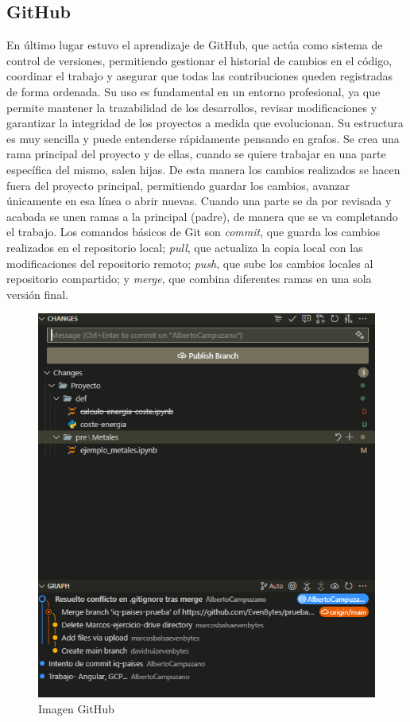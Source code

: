 \subsection{GitHub}
%
%
En último lugar estuvo el aprendizaje de GitHub, que actúa como sistema de control de versiones, permitiendo gestionar el historial de cambios en el código, coordinar el trabajo y asegurar que todas las contribuciones queden registradas de forma ordenada. Su uso es fundamental en un entorno profesional, ya que permite mantener la trazabilidad de los desarrollos, revisar modificaciones y garantizar la integridad de los proyectos a medida que evolucionan. Su estructura es muy sencilla y puede entenderse rápidamente pensando en grafos. Se crea una rama principal del proyecto y de ellas, cuando se quiere trabajar en una parte específica del mismo, salen hijas. De esta manera los cambios realizados se hacen fuera del proyecto principal, permitiendo guardar los cambios, avanzar únicamente en esa línea o abrir nuevas. Cuando una parte se da por revisada y acabada se unen ramas a la principal (padre), de manera que se va completando el trabajo. Los comandos básicos de Git son \textit{commit}, que guarda los cambios realizados en el repositorio local; \textit{pull}, que actualiza la copia local con las modificaciones del repositorio remoto; \textit{push}, que sube los cambios locales al repositorio compartido; y \textit{merge}, que combina diferentes ramas en una sola versión final.
\begin{figure}[H]
    \centering
    \includegraphics[width=0.42\linewidth]{figuras/captura_github.png}
    \caption[Interfaz de GitHub en Visual Code]{Imagen GitHub}
    \label{GitHub}
\end{figure}
%
%
